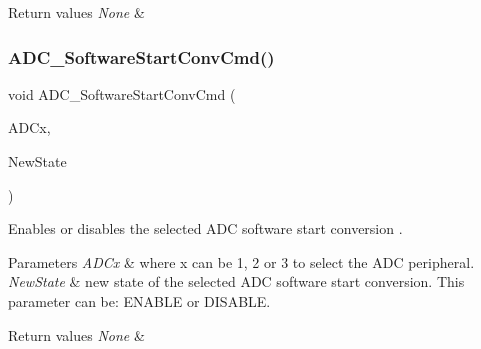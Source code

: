 \begin{DoxyRetVals}{Return values}
{\em None} & \\
\hline
\end{DoxyRetVals}
\mbox{\label{group___a_d_c___private___functions_ga694130a8d1ad3c8877b7eddb29611b30}} 
\subsubsection{\texorpdfstring{ADC\_SoftwareStartConvCmd()}{ADC\_SoftwareStartConvCmd()}}
{\footnotesize\ttfamily void A\+D\+C\+\_\+\+Software\+Start\+Conv\+Cmd (\begin{DoxyParamCaption}\item[{\mbox{\hyperlink{struct_a_d_c___type_def}{A\+D\+C\+\_\+\+Type\+Def}} $\ast$}]{A\+D\+Cx,  }\item[{\mbox{\hyperlink{group___exported__types_gac9a7e9a35d2513ec15c3b537aaa4fba1}{Functional\+State}}}]{New\+State }\end{DoxyParamCaption})}



Enables or disables the selected A\+DC software start conversion . 


\begin{DoxyParams}{Parameters}
{\em A\+D\+Cx} & where x can be 1, 2 or 3 to select the A\+DC peripheral. \\
\hline
{\em New\+State} & new state of the selected A\+DC software start conversion. This parameter can be\+: E\+N\+A\+B\+LE or D\+I\+S\+A\+B\+LE. \\
\hline
\end{DoxyParams}

\begin{DoxyRetVals}{Return values}
{\em None} & \\
\hline
\end{DoxyRetVals}
\mbox{\label{group___a_d_c___private___functions_ga5b141d5dbf5f417a11dfa622c8c149d3}} 
